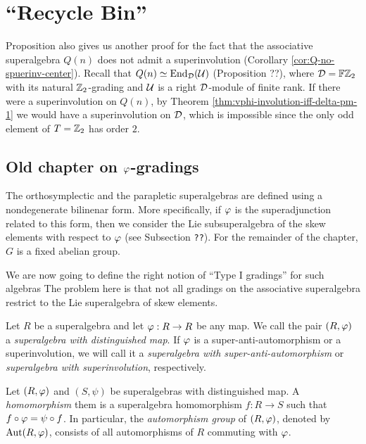 
\chapter{``Recycle Bin''}

\begin{remark}
	Proposition
	also gives us another proof for the fact that the associative superalgebra $Q(n)$ does not admit a superinvolution (Corollary \ref{cor:Q-no-spuerinv-center}).
	Recall that $Q(n) \simeq \operatorname{End}_{\mathcal{D}} (\mathcal U)$ (Proposition ??), where $\mathcal{D}= \mathbb{F}\mathbb{Z}_2$ with its natural $\mathbb{Z}_2$-grading and $\mathcal U$ is a right $\mathcal{D}$-module of finite rank.
	If there were a superinvolution on $Q(n)$, by Theorem \ref{thm:vphi-involution-iff-delta-pm-1} we would have a superinvolution on $\mathcal{D}$, which is impossible since the only odd element of $T = \mathbb{Z}_2$ has order $2$.
\end{remark}

\section{Old chapter on $\varphi$-gradings}

The orthosymplectic and the parapletic superalgebras are defined using a nondegenerate bilinenar form. More specifically, if $\varphi$ is the superadjunction related to this form, then we consider the Lie subsuperalgebra of the skew elements with respect to $\varphi$ (see Subsection {\tt ??}). For the remainder of the chapter, $G$ is a fixed abelian group.

We are now going to define the right notion of ``Type I gradings'' for such algebras %
The problem here is that not all gradings on the associative superalgebra restrict to the Lie superalgebra of skew elements.

\begin{defi}
	Let $R$ be a superalgebra and let $\varphi: R\to R$ be any map. We call the pair $(R, \varphi)$ a \emph{superalgebra with distinguished map}. If $\varphi$ is a super-anti-automorphism or a superinvolution, we will call it a \emph{superalgebra with super-anti-automorphism} or \emph{superalgebra with superinvolution}, respectively.
\end{defi}

\begin{defi}
	Let $(R, \varphi)$ and $(S, \psi)$ be superalgebras with distinguished map. A \emph{homomorphism} them is a superalgebra homomorphism $f: R\to S$ such that $f\circ \varphi = \psi \circ f$. In particular, the \emph{automorphism group} of $(R, \varphi)$, denoted by $\operatorname{Aut}(R, \varphi)$, consists of all automorphisms of $R$ commuting with $\varphi$.
\end{defi}


